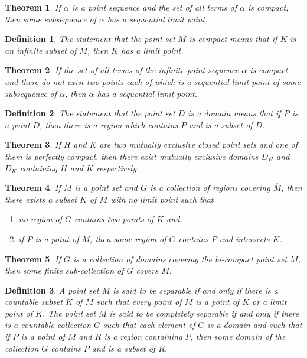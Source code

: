 \documentclass[10pt]{report}
\newtheorem{theorem}{Theorem}
\newtheorem{definition}{Definition}
\newcommand{\cl}[1]{\overline{#1}}
\begin{document}
\begin{theorem}
 If $\alpha$ is a point sequence and the set of all terms of $\alpha$ is compact, then some
subsequence of $\alpha$ has a sequential limit point.
\end{theorem}

\begin{definition}
 The statement that the point set $M$ is compact means that if $K$ is an infinite subset of $M$, then
$K$ has a limit point.
\end{definition}

\begin{theorem}
 If the set of all terms of the infinite point sequence $\alpha$ is compact and there do not exist
two points each of which is a sequential limit point of some subsequence of $\alpha$, then $\alpha$
has a sequential limit point.
\end{theorem}

\begin{definition}
The statement that the point set $D$ is a domain means that if $P$ is a point $D$, then there is a
region which contains $P$ and is a subset of $D$.
\end{definition}

\begin{theorem}
 If $H$ and $K$ are two mutually exclusive closed point sets and one of them is perfectly compact, then there exist
mutually exclusive domains $D_H$ and $D_K$ containing $H$ and $K$ respectively.
\end{theorem}

\begin{theorem}
 If $M$ is a point set and $G$ is a collection of regions covering $\cl{M}$, then there exists a
subset $K$ of $M$ with no limit point such that 
\begin{enumerate}
 \item[(1)] no region of $G$ contains two points of $K$ and 
 \item[(2)] if $P$ is a point of $M$, then some region of $G$ contains $P$ and intersects $K$.
\end{enumerate}
\end{theorem}

\begin{theorem}
 If $G$ is a collection of domains covering the bi-compact point set $M$, then some finite sub-collection of $G$ covers
$M$.
\end{theorem}

\begin{definition}
 A point set $M$ is said to be separable if and only if there is a countable subset $K$ of $M$ such that every point of
$M$ is a point of $K$ or a limit point of $K$. The point set $M$ is said to be completely separable if and only if there
is a countable collection $G$ such that each element of $G$ is a domain and such that if $P$ is a point of $M$ and $R$
is a region containing $P$, then some domain of the collection $G$ contains $P$ and is a subset of $R$.
\end{definition}
\end{document}

